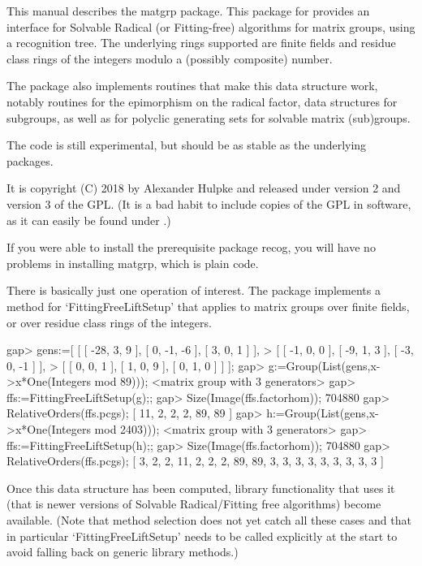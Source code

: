 %
%
%
%


This manual describes the {\sf matgrp} package. This package for {\GAP}
provides an interface for Solvable Radical (or Fitting-free) algorithms for
matrix groups, using a recognition tree. The underlying rings supported are
finite fields and residue class rings of the integers modulo a (possibly
composite) number.

The package also implements routines that make this data structure work,
notably routines for the epimorphism on the radical factor, data structures for subgroups, as well as for polyclic
generating sets for solvable matrix (sub)groups.

The code is still experimental, but should be as stable as the underlying
packages.

It is copyright (C) 2018 by Alexander Hulpke and released under version 2
and version 3 of the GPL. (It is a bad habit to include copies of the GPL in
software, as it can easily be found under
.)

If you were able to install the prerequisite package {\sf recog}, you will
have no problems in installing {\sf matgrp}, which is plain {\GAP} code.


There is basically just one operation of interest. The package implements a
method for `FittingFreeLiftSetup' that applies to matrix groups over finite
fields, or over residue class rings of the integers.

\beginexample
gap> gens:=[ [ [ -28, 3, 9 ], [ 0, -1, -6 ], [ 3, 0, 1 ] ],   
>   [ [ -1, 0, 0 ], [ -9, 1, 3 ], [ -3, 0, -1 ] ], 
>   [ [ 0, 0, 1 ], [ 1, 0, 9 ], [ 0, 1, 0 ] ] ];
gap> g:=Group(List(gens,x->x*One(Integers mod 89))); 
<matrix group with 3 generators>
gap> ffs:=FittingFreeLiftSetup(g);;
gap> Size(Image(ffs.factorhom));
704880
gap> RelativeOrders(ffs.pcgs);
[ 11, 2, 2, 2, 89, 89 ]
gap> h:=Group(List(gens,x->x*One(Integers mod 2403)));
<matrix group with 3 generators>
gap> ffs:=FittingFreeLiftSetup(h);;
gap> Size(Image(ffs.factorhom));
704880
gap> RelativeOrders(ffs.pcgs);
[ 3, 2, 2, 11, 2, 2, 2, 89, 89, 3, 3, 3, 3, 3, 3, 3, 3, 3 ]
\endexample

Once this data structure has been computed, library functionality that uses
it (that is newer versions of Solvable Radical/Fitting free algorithms)
become available. (Note that method selection does not yet catch all these
cases and that in particular `FittingFreeLiftSetup' needs to be called
explicitly at the start to avoid falling back on generic library methods.)

